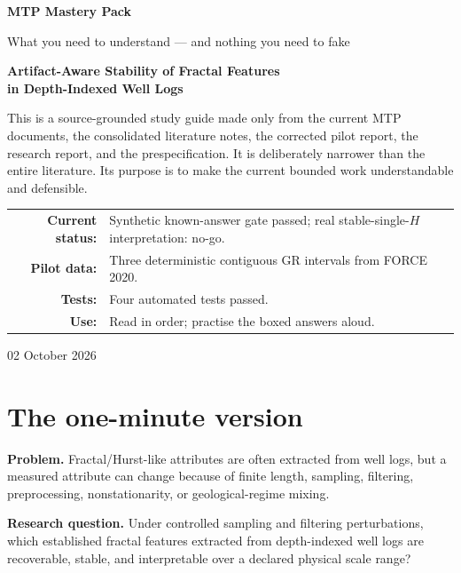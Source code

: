 \documentclass[11pt,a4paper]{article}
\begin{document}
\begin{titlepage}
\centering
\vspace*{1.1cm}
{\Huge\bfseries\color{Navy} MTP Mastery Pack\par}
\vspace{0.35cm}
{\Large\color{Teal} What you need to understand --- and nothing you need to fake\par}
\vspace{1cm}
{\LARGE\bfseries Artifact-Aware Stability of Fractal Features\\in Depth-Indexed Well Logs\par}
\vspace{0.8cm}
\begin{minipage}{0.88\textwidth}
\small
This is a source-grounded study guide made only from the current MTP documents, the consolidated literature notes, the corrected pilot report, the research report, and the prespecification. It is deliberately narrower than the entire literature. Its purpose is to make the current bounded work understandable and defensible.
\end{minipage}
\vfill
\begin{tabular}{rl}
\textbf{Current status:} & Synthetic known-answer gate passed; real stable-single-$H$ interpretation: no-go.\\
\textbf{Pilot data:} & Three deterministic contiguous GR intervals from FORCE 2020.\\
\textbf{Tests:} & Four automated tests passed.\\
\textbf{Use:} & Read in order; practise the boxed answers aloud.
\end{tabular}
\vfill
{\large 02 October 2026\par}
\end{titlepage}

\tableofcontents
\newpage

\section{The one-minute version}
\textbf{Problem.} Fractal/Hurst-like attributes are often extracted from well logs, but a measured attribute can change because of finite length, sampling, filtering, preprocessing, nonstationarity, or geological-regime mixing.

\textbf{Research question.} Under controlled sampling and filtering perturbations, which established fractal features extracted from depth-indexed well logs are recoverable, stable, and interpretable over a declared physical scale range?
\end{document}
